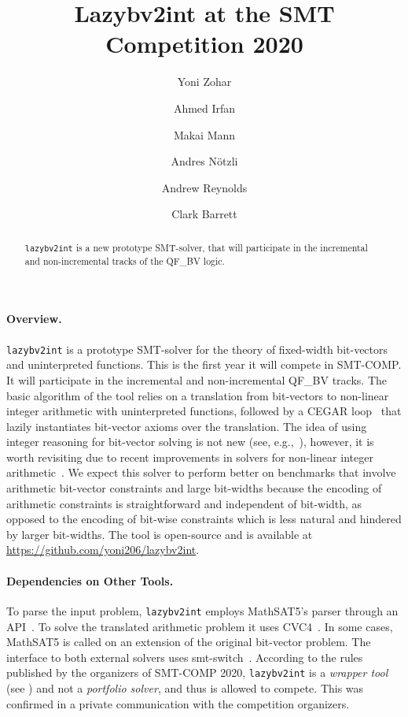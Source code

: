 \documentclass{easychair}
\newcommand{\lazybvtoint}{\texttt{lazybv2int}\xspace}
\newcommand{\smtcomp}{SMT-COMP\xspace}
\newcommand{\qfbv}{QF\_BV\xspace}
\newcommand{\msat}{MathSAT5\xspace}
\newcommand{\cvcfour}{CVC4\xspace}
\newcommand{\smtswitch}{smt-switch\xspace}
\begin{document}
\author{
		Yoni Zohar\and
		Ahmed Irfan \and
		Makai Mann \and
		Andres N\"otzli \and
		Andrew Reynolds\and
		Clark Barrett
}

\title{Lazybv2int at the SMT Competition 2020}

\maketitle


\noindent
\begin{abstract}
\noindent \lazybvtoint is a new prototype SMT-solver, that will participate in
the incremental and non-incremental tracks of the \qfbv logic.
\end{abstract}

\paragraph{Overview.}
\lazybvtoint is a prototype SMT-solver for the theory of fixed-width bit-vectors
and uninterpreted functions. This is the first year it will compete in \smtcomp.
It will participate in the incremental and non-incremental \qfbv tracks.
%
The basic algorithm of the tool relies on a translation from bit-vectors to
non-linear integer arithmetic with uninterpreted functions, followed by a CEGAR
loop~\cite{cegar} that lazily instantiates bit-vector axioms over the
translation. The idea of using integer reasoning for bit-vector solving is not
new (see,
e.g.,~\cite{DBLP:journals/entcs/BozzanoBCFHKPS06,DBLP:conf/fmcad/BackemanRZ18}),
however, it is worth revisiting due to recent improvements in solvers for
non-linear integer arithmetic~\cite{DBLP:conf/vmcai/Jovanovic17,
  DBLP:conf/frocos/ReynoldsTJB17, DBLP:conf/sat/CimattiGIRS18}.
%
We expect this solver to perform better on benchmarks that involve arithmetic
bit-vector constraints and large bit-widths because the encoding of arithmetic
constraints is straightforward and independent of bit-width, as opposed to the
encoding of bit-wise constraints which is less natural and hindered by larger
bit-widths.
%
The tool is open-source and is available at \url{https://github.com/yoni206/lazybv2int}.

\paragraph{Dependencies on Other Tools.}
%
To parse the input problem, \lazybvtoint employs \msat's
parser through an API~\cite{mathsat5}.
To solve the translated arithmetic problem it uses \cvcfour~\cite{cvc4}.
In some cases, \msat is called on an extension of the original bit-vector problem.
%
The interface to both external solvers uses
\smtswitch~\cite{smtswitchgithub}.
%
According to the rules published by the organizers
of \smtcomp 2020, \lazybvtoint is a {\em wrapper tool} (see \cite{rules20})
and not a {\em portfolio solver},
and thus is allowed to compete.
This was confirmed in a private communication with the competition organizers.
\end{document}
